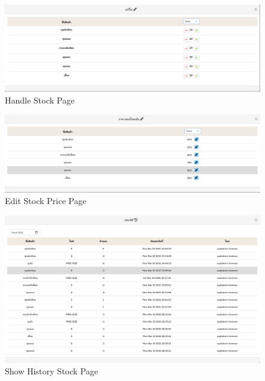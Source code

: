 \begin{figure}
  \begin{center}
  \includegraphics[width=\linewidth]{images/handleStock.png}
  \end{center}
  \caption[Poem]{Handle Stock Page}
  \label{fig:CheckStock}
  \end{figure}
\begin{figure}
  \begin{center}
  \includegraphics[width=\linewidth]{images/editPrice.png}
  \end{center}
  \caption[Poem]{Edit Stock Price Page}
  \label{fig:editPrice}
  \end{figure}
\begin{figure}
  \begin{center}
  \includegraphics[width=\linewidth]{images/historyStock.png}
  \end{center}
  \caption[Poem]{Show History Stock Page}
  \label{fig:HistoryStock}
  \end{figure}
